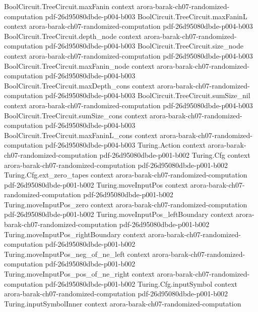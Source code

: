 \begin{theorem}
  {BoolCircuit.TreeCircuit.maxFanin}
  {context}
  {arora-barak-ch07-randomized-computation}
  {pdf-26d95080dbde-p004-b003}
\proofstep
  {BoolCircuit.TreeCircuit.maxFaninL}
  {context}
  {arora-barak-ch07-randomized-computation}
  {pdf-26d95080dbde-p004-b003}
\proofstep
  {BoolCircuit.TreeCircuit.depth_node}
  {context}
  {arora-barak-ch07-randomized-computation}
  {pdf-26d95080dbde-p004-b003}
\proofstep
  {BoolCircuit.TreeCircuit.size_node}
  {context}
  {arora-barak-ch07-randomized-computation}
  {pdf-26d95080dbde-p004-b003}
\proofstep
  {BoolCircuit.TreeCircuit.maxFanin_node}
  {context}
  {arora-barak-ch07-randomized-computation}
  {pdf-26d95080dbde-p004-b003}
\proofstep
  {BoolCircuit.TreeCircuit.maxDepth_cons}
  {context}
  {arora-barak-ch07-randomized-computation}
  {pdf-26d95080dbde-p004-b003}
\proofstep
  {BoolCircuit.TreeCircuit.sumSize_nil}
  {context}
  {arora-barak-ch07-randomized-computation}
  {pdf-26d95080dbde-p004-b003}
\proofstep
  {BoolCircuit.TreeCircuit.sumSize_cons}
  {context}
  {arora-barak-ch07-randomized-computation}
  {pdf-26d95080dbde-p004-b003}
\proofstep
  {BoolCircuit.TreeCircuit.maxFaninL_cons}
  {context}
  {arora-barak-ch07-randomized-computation}
  {pdf-26d95080dbde-p004-b003}
\proofstep
  {Turing.Action}
  {context}
  {arora-barak-ch07-randomized-computation}
  {pdf-26d95080dbde-p001-b002}
\proofstep
  {Turing.Cfg}
  {context}
  {arora-barak-ch07-randomized-computation}
  {pdf-26d95080dbde-p001-b002}
\proofstep
  {Turing.Cfg.ext_zero_tapes}
  {context}
  {arora-barak-ch07-randomized-computation}
  {pdf-26d95080dbde-p001-b002}
\proofstep
  {Turing.moveInputPos}
  {context}
  {arora-barak-ch07-randomized-computation}
  {pdf-26d95080dbde-p001-b002}
\proofstep
  {Turing.moveInputPos_zero}
  {context}
  {arora-barak-ch07-randomized-computation}
  {pdf-26d95080dbde-p001-b002}
\proofstep
  {Turing.moveInputPos_leftBoundary}
  {context}
  {arora-barak-ch07-randomized-computation}
  {pdf-26d95080dbde-p001-b002}
\proofstep
  {Turing.moveInputPos_rightBoundary}
  {context}
  {arora-barak-ch07-randomized-computation}
  {pdf-26d95080dbde-p001-b002}
\proofstep
  {Turing.moveInputPos_neg_of_ne_left}
  {context}
  {arora-barak-ch07-randomized-computation}
  {pdf-26d95080dbde-p001-b002}
\proofstep
  {Turing.moveInputPos_pos_of_ne_right}
  {context}
  {arora-barak-ch07-randomized-computation}
  {pdf-26d95080dbde-p001-b002}
\proofstep
  {Turing.Cfg.inputSymbol}
  {context}
  {arora-barak-ch07-randomized-computation}
  {pdf-26d95080dbde-p001-b002}
\proofstep
  {Turing.inputSymbolInner}
  {context}
  {arora-barak-ch07-randomized-computation}

\end{theorem}
